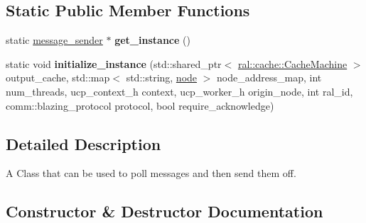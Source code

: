 \subsection*{Static Public Member Functions}
\begin{DoxyCompactItemize}
\item 
\mbox{\label{classcomm_1_1message__sender_aa62c8d7a6c5f9b41c69ae9d3699fb985}} 
static \hyperlink{classcomm_1_1message__sender}{message\+\_\+sender} $\ast$ {\bfseries get\+\_\+instance} ()
\item 
\mbox{\label{classcomm_1_1message__sender_a30526fdd6ad63ee220b8a7cbe0f6d100}} 
static void {\bfseries initialize\+\_\+instance} (std\+::shared\+\_\+ptr$<$ \hyperlink{classral_1_1cache_1_1CacheMachine}{ral\+::cache\+::\+Cache\+Machine} $>$ output\+\_\+cache, std\+::map$<$ std\+::string, \hyperlink{classcomm_1_1node}{node} $>$ node\+\_\+address\+\_\+map, int num\+\_\+threads, ucp\+\_\+context\+\_\+h context, ucp\+\_\+worker\+\_\+h origin\+\_\+node, int ral\+\_\+id, comm\+::blazing\+\_\+protocol protocol, bool require\+\_\+acknowledge)
\end{DoxyCompactItemize}


\subsection{Detailed Description}
A Class that can be used to poll messages and then send them off. 

\subsection{Constructor \& Destructor Documentation}
\mbox{\label{classcomm_1_1message__sender_a0908364a7c34e29380f7a309b1f65c14}} 
